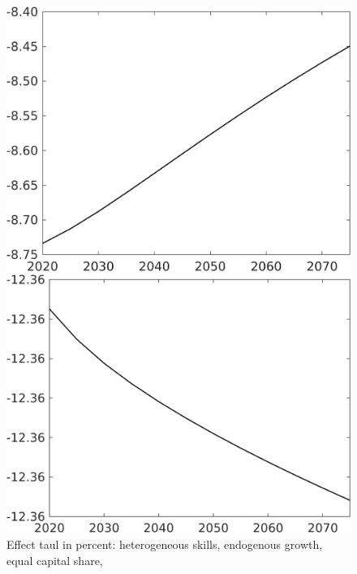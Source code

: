 \documentclass[12pt]{article}
\begin{document}
\begin{figure}[h!!]
	\centering
	\caption{Effect taul in percent: heterogeneous skills, endogenous growth, equal capital share,  }\label{fig:LF_BAU_nsk0_xgr0_equalcapShare}
	\begin{minipage}[]{0.32\textwidth}
		\includegraphics[width=1\textwidth]{../../codding_model/own_basedOnFried/optimalPol_010922_revision/figures/all_13Sept22/CompTaul_Equlab_LFBAUPer_Reg0_Emnet_spillover0_nsk0_xgr0_knspil0_sep1_countec0_GovRev0_etaa0.79.png}
	\end{minipage}	
	\begin{minipage}[]{0.32\textwidth}
		\includegraphics[width=1\textwidth]{../../codding_model/own_basedOnFried/optimalPol_010922_revision/figures/all_13Sept22/CompTaul_Equlab_LFBAUPer_Reg0_hh_spillover0_nsk0_xgr0_knspil0_sep1_countec0_GovRev0_etaa0.79.png}

\end{minipage}
\end{figure}
\end{document}
